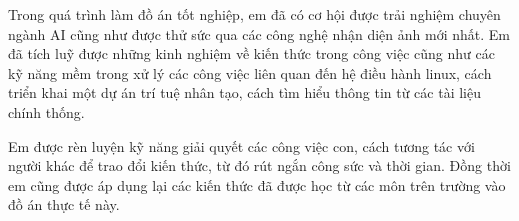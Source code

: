 \documentclass[12pt,a4paper,openany,oneside]{report}
\begin{document}
Trong quá trình làm đồ án tốt nghiệp, em đã có cơ hội được trải nghiệm chuyên ngành AI cũng như được thử sức qua các công nghệ nhận diện ảnh mới nhất. Em đã tích luỹ được những kinh nghiệm về kiến thức trong công việc cũng như các kỹ năng mềm trong xử lý các công việc liên quan đến hệ điều hành linux, cách triển khai một dự án trí tuệ nhân tạo, cách tìm hiểu thông tin từ các tài liệu chính thống.
 
Em được rèn luyện kỹ năng giải quyết các công việc con, cách tương tác với người khác để trao đổi kiến thức, từ đó rút ngắn công sức và thời gian. Đồng thời em cũng được áp dụng lại các kiến thức đã được học từ các môn trên trường vào đồ án thực tế này.


\end{document}
